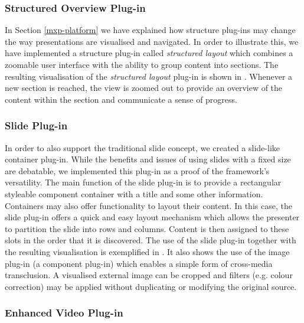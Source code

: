     \subsubsection{Structured Overview Plug-in}

     In Section \ref{mxp-platform} we have explained how structure plug-ins may
     change the way presentations are visualised and navigated. In order to
     illustrate this, we have implemented a structure plug-in called
     \emph{structured layout} which combines a zoomable user interface with the
     ability to group content into sections. The resulting visualisation of the
     \emph{structured layout} plug-in is shown in .
     Whenever a new section is reached, the view is zoomed out to provide an
     overview of the content within the section and communicate a sense of
     progress.

    \subsubsection{Slide Plug-in}

     In order to also support the traditional slide concept, we created a
     slide-like container plug-in. While the benefits and issues of using
     slides with a fixed size are debatable, we implemented this plug-in as a
     proof of the framework's versatility. The main function of the slide
     plug-in is to provide a rectangular styleable component container with a
     title and some other information. Containers may also offer functionality
     to layout their content. In this case, the slide plug-in offers a quick
     and easy layout mechanism which allows the presenter to partition the
     slide into rows and columns. Content is then assigned to these slots in
     the order that it is discovered. The use of the slide plug-in together
     with the resulting visualisation is exemplified in . It
     also shows the use of the image plug-in (a component plug-in) which
     enables a simple form of cross-media transclusion. A visualised external
     image can be cropped and filters (e.g. colour correction) may be applied
     without duplicating or modifying the original source.


    \subsubsection{Enhanced Video Plug-in}

